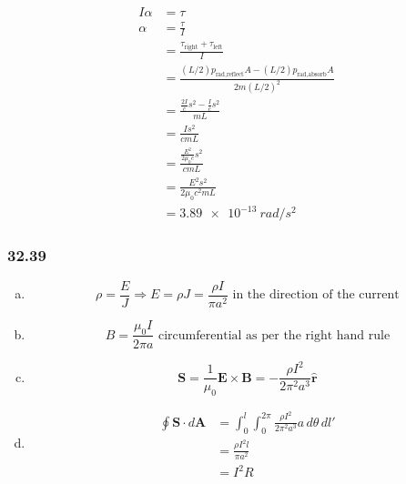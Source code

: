 \documentclass{article}
\begin{document}
\begin{align*}
  I \alpha & = \tau                                                                                 \\
  \alpha   & = \frac{\tau}{I}                                                                       \\
           & = \frac{\tau_\text{right} + \tau_\text{left}}{I}                                       \\
           & = \frac{(L / 2) p_\text{rad,reflect} A - (L / 2) p_\text{rad,absorb} A}{2 m (L / 2)^2} \\
           & = \frac{\frac{2 I}{c} s^2 - \frac{I}{c} s^2}{m L}                                      \\
           & = \frac{I s^2}{c m L}                                                                  \\
           & = \frac{\frac{E^2}{2 \mu_0 c} s^2}{c m L}                                              \\
           & = \frac{E^2 s^2}{2 \mu_0 c^2 m L}                                                      \\
           & = \qty{3.89e-13}{rad/s^2}
\end{align*}

\subsubsection{32.39}

\begin{enumerate}[(a)]
  \item \[\rho = \frac{E}{J} \Rightarrow E = \rho J = \frac{\rho I}{\pi a^2} \text{ in the direction of the current}\]

  \item \[B = \frac{\mu_0 I}{2 \pi a} \text{ circumferential as per the right hand rule}\]

  \item \[\mathbf{S} = \frac{1}{\mu_0} \mathbf{E} \times \mathbf{B} = -\frac{\rho I^2}{2 \pi^2 a^3} \hat{\mathbf{r}}\]

  \item

        \begin{align*}
          \oint \mathbf{S} \cdot d \mathbf{A} & = \int_0^l \int_0^{2 \pi} \frac{\rho I^2}{2 \pi^2 a^3} a \,d\theta \,dl' \\
                                              & = \frac{\rho I^2 l}{\pi a^2}                                             \\
                                              & = I^2 R
        \end{align*}
\end{enumerate}
\end{document}

